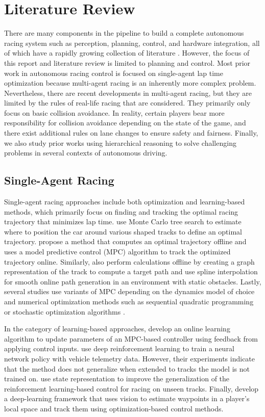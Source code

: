 \chapter{Literature Review} \label{chapter:litreview}
There are many components in the pipeline to build a complete autonomous racing system such as perception, planning, control, and hardware integration, all of which have a rapidly growing collection of literature \cite{litreview}. However, the focus of this report and literature review is limited to planning and control. Most prior work in autonomous racing control is focused on single-agent lap time optimization because multi-agent racing is an inherently more complex problem. Nevertheless, there are recent developments in multi-agent racing, but they are limited by the rules of real-life racing that are considered. They primarily only focus on basic collision avoidance. In reality, certain players bear more responsibility for collision avoidance depending on the state of the game, and there exist additional rules on lane changes to ensure safety and fairness. Finally, we also study prior works using hierarchical reasoning to solve challenging problems in several contexts of autonomous driving. 

\section{Single-Agent Racing} 
Single-agent racing approaches include both optimization and learning-based methods, which primarily focus on finding and tracking the optimal racing trajectory that minimizes lap time. \citet{Hou2016} use Monte Carlo tree search to estimate where to position the car around various shaped tracks to define an optimal trajectory. \citet{Vazquez2020} propose a method that computes an optimal trajectory offline and uses a model predictive control (MPC) algorithm to track the optimized trajectory online. Similarly, \citet{Stahl2019_2} also perform calculations offline by creating a graph representation of the track to compute a target path and use spline interpolation for smooth online path generation in an environment with static obstacles. Lastly, several studies use variants of MPC depending on the dynamics model of choice and numerical optimization methods such as sequential quadratic programming or stochastic optimization algorithms \cite{Liniger2014, Anderson2016, Kalaria2021, Kloeser2020, OKelly2020}.  

In the category of learning-based approaches, \citet{Kabzan2019} develop an online learning algorithm to update parameters of an MPC-based controller using feedback from applying control inputs. \citet{Remonda2021} use deep reinforcement learning to train a neural network policy with vehicle telemetry data. However, their experiments indicate that the method does not generalize when extended to tracks the model is not trained on. \citet{deBruin2018} use state representation to improve the generalization of the reinforcement learning-based control for racing on unseen tracks. Finally, \citet{weiss2020} develop a deep-learning framework that uses vision to estimate waypoints in a player's local space and track them using optimization-based control methods.

